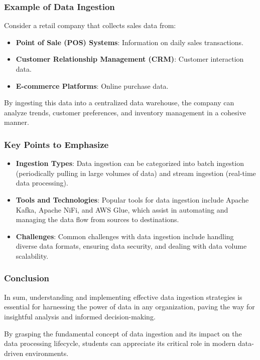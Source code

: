 \documentclass{beamer}
\begin{document}
\begin{frame}[fragile]
    \frametitle{Example of Data Ingestion}
    Consider a retail company that collects sales data from:
    
    \begin{itemize}
        \item \textbf{Point of Sale (POS) Systems}: Information on daily sales transactions.
        
        \item \textbf{Customer Relationship Management (CRM)}: Customer interaction data.
        
        \item \textbf{E-commerce Platforms}: Online purchase data.
    \end{itemize}
    
    By ingesting this data into a centralized data warehouse, the company can analyze trends, customer preferences, and inventory management in a cohesive manner.
\end{frame}

\begin{frame}[fragile]
    \frametitle{Key Points to Emphasize}
    \begin{itemize}
        \item \textbf{Ingestion Types}: Data ingestion can be categorized into batch ingestion (periodically pulling in large volumes of data) and stream ingestion (real-time data processing).
        
        \item \textbf{Tools and Technologies}: Popular tools for data ingestion include Apache Kafka, Apache NiFi, and AWS Glue, which assist in automating and managing the data flow from sources to destinations.
        
        \item \textbf{Challenges}: Common challenges with data ingestion include handling diverse data formats, ensuring data security, and dealing with data volume scalability.
    \end{itemize}
\end{frame}

\begin{frame}[fragile]
    \frametitle{Conclusion}
    In sum, understanding and implementing effective data ingestion strategies is essential for harnessing the power of data in any organization, paving the way for insightful analysis and informed decision-making.
    
    By grasping the fundamental concept of data ingestion and its impact on the data processing lifecycle, students can appreciate its critical role in modern data-driven environments.
\end{frame}
\end{document}
